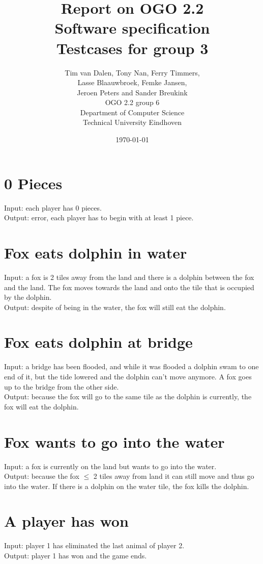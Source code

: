 \documentclass[a4paper,11pt]{article}
\title{Report on OGO 2.2 \\ Software specification\\ Testcases for group 3}
\author{
        Tim van Dalen, Tony Nan, Ferry Timmers, \\ Lasse Blaauwbroek, Femke Jansen, \\Jeroen Peters and Sander Breukink\\ OGO 2.2 group 6 \\
                Department of Computer Science\\
        Technical University Eindhoven\\
}
\date{\today}
\begin{document}
\maketitle
	
	\section{0 Pieces}
    Input: each player has 0 pieces.\\
    Output: error, each player has to begin with at least 1 piece.

	\section{Fox eats dolphin in water}
    Input: a fox is 2 tiles away from the land and there is a dolphin between the fox and the land. The fox moves towards the land and onto the tile that is occupied by the dolphin.\\
    Output: despite of being in the water, the fox will still eat the dolphin.\\

    \section{Fox eats dolphin at bridge}
    Input: a bridge has been flooded, and while it was flooded a dolphin swam to one end of it, but the tide lowered and the dolphin can't move anymore. A fox goes up to the bridge from the other side.\\
    Output: because the fox will go to the same tile as the dolphin is currently, the fox will eat the dolphin.\\

    \section{Fox wants to go into the water}
    Input: a fox is currently on the land but wants to go into the water.\\
    Output: because the fox $\leq$ 2 tiles away from land it can still move and thus go into the water. If there is a dolphin on the water tile, the fox kills the dolphin.\\

    \section{A player has won}
    Input: player 1 has eliminated the last animal of player 2.\\
    Output: player 1 has won and the game ends.\\
\end{document}

